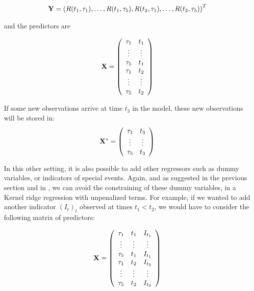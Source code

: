 $$
{\bf Y} = \left(R(t_1, \tau_1), \ldots, R(t_1, \tau_5), R(t_2, \tau_1), \ldots, R(t_2, \tau_5)\right)^T
$$

and the predictors are 

$$
{\bf X} = \left( {\begin{array}{cc} \tau_1 &  t_1\\
                          \vdots & \vdots\\
                          \tau_5 &  t_1\\
                          \tau_1 &  t_2\\
                          \vdots & \vdots\\
                          \tau_5 &  t_2\\
       \end{array} } \right)
$$

If some new observations arrive at time $t_3$ in the model, these new observations will be stored in: 
$$
{\bf X}^* = \left( {\begin{array}{cc} \tau_1 &  t_3\\
                          \vdots & \vdots\\
                          \tau_5 &  t_3\\
       \end{array} } \right)
$$

In this other setting, it is also possible to add other regressors  such as dummy variables, or indicators of special events. Again, and as suggested in the previous section and in \cite{exterkate2016nonlinear}, we can avoid the constraining of these dummy variables, in a Kernel ridge regression with unpenalized terms. For example, if we wanted to add another indicator $(I_t)_t$ observed at times $t_1 < t_2$, we would have to consider the following matrix of predictors:

$$
{\bf X} = \left( {\begin{array}{ccc}
                \tau_1 &  t_1   & I_{t_1}\\
                \vdots & \vdots & \vdots\\
                \tau_5 &  t_1   & I_{t_1}\\
                \tau_1 &  t_2   & I_{t_2}\\
                \vdots & \vdots & \vdots\\
                \tau_5 &  t_2   & I_{t_2}\\
               \end{array} } \right)
$$

